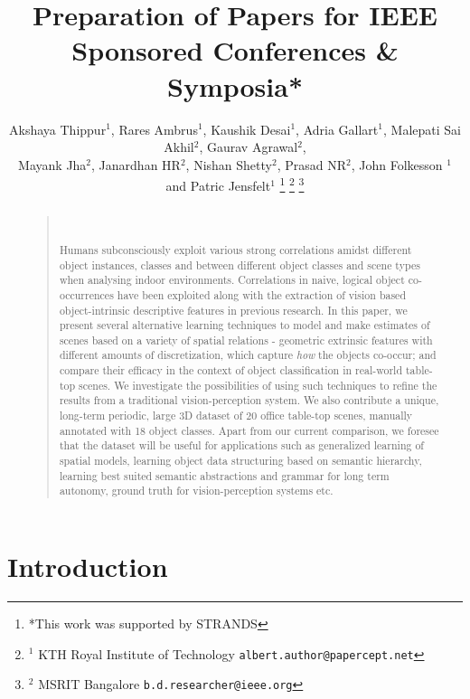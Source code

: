 \documentclass[letterpaper, 10 pt, conference]{ieeeconf}  %
\title{\LARGE \bf
Preparation of Papers for IEEE Sponsored Conferences \& Symposia*
}
\author{Akshaya Thippur$^{1}$, Rares Ambrus$^{1}$, Kaushik Desai$^{1}$, Adria Gallart$^{1}$, Malepati Sai Akhil$^{2}$, Gaurav Agrawal$^{2}$,\\Mayank Jha$^{2}$, Janardhan HR$^{2}$, Nishan Shetty$^{2}$, Prasad NR$^{2}$, John Folkesson $^{1}$ and Patric Jensfelt$^{1}$%
\thanks{*This work was supported by STRANDS}%
\thanks{$^{1}$ KTH Royal Institute of Technology
        {\tt\small albert.author@papercept.net}}%
\thanks{$^{2}$ MSRIT Bangalore
        {\tt\small b.d.researcher@ieee.org}}%
}
\begin{document}
\maketitle
\thispagestyle{empty}
\pagestyle{empty}

\begin{abstract}
\begin{quote}\

Humans subconsciously exploit various strong correlations amidst different object instances, classes and between different object classes and scene types when analysing indoor environments. Correlations in naive, logical object co-occurrences have been exploited along with the extraction of vision based object-intrinsic descriptive features in previous research. In this paper, we present several alternative learning techniques to model and make estimates of scenes based on a variety of spatial relations - geometric extrinsic features with different amounts of discretization, which capture \textit{how} the objects co-occur; and compare their efficacy in the context of object classification in real-world table-top scenes. We investigate the possibilities of using such techniques to refine the results from a traditional vision-perception system. We also contribute a unique, long-term periodic, large 3D dataset of 20 office table-top scenes, manually annotated with 18 object classes. Apart from our current comparison, we foresee that the dataset will be useful for applications such as generalized learning of spatial models, learning object data structuring based on semantic hierarchy, learning best suited semantic abstractions and grammar for long term autonomy, ground truth for vision-perception systems etc.

\end{quote}
\end{abstract}


\section{Introduction}
\label{sec:Introduction}
\end{document}
